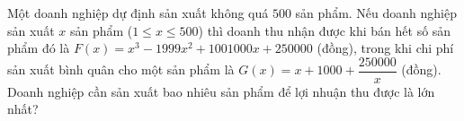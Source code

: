 \begin{ex}
Một doanh nghiệp dự định sản xuất không quá $500$ sản phẩm. Nếu doanh nghiệp sản xuất $x$ sản phẩm ($1\le x\le500$) thì doanh thu nhận được khi bán hết số sản phẩm đó là $F(x)=x^3-1999x^2+1001000x+250000$ (đồng), trong khi chi phí sản xuất bình quân cho một sản phẩm là $G(x)=x+1000+\dfrac{250000}{x}$ (đồng). Doanh nghiệp cần sản xuất bao nhiêu sản phẩm để lợi nhuận thu được là lớn nhất?
\end{ex}
